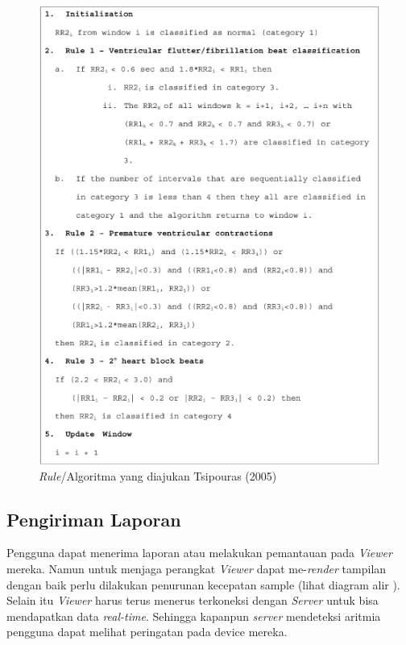 \begin{figure}[H]
	\centering
	\includegraphics[scale=0.8]{images/algo_detect.png}
	\caption{\textit{Rule}/Algoritma yang diajukan Tsipouras (2005)}
	\label{Algo:rule}
\end{figure}

\subsection{Pengiriman Laporan}
Pengguna dapat menerima laporan atau melakukan pemantauan pada \textit{Viewer} mereka. Namun untuk menjaga perangkat \textit{Viewer} dapat me-\textit{render} tampilan dengan baik perlu dilakukan penurunan kecepatan sample (lihat diagram alir ). Selain itu \textit{Viewer} harus terus menerus terkoneksi dengan \textit{Server} untuk bisa mendapatkan data \textit{real-time}. Sehingga kapanpun \textit{server} mendeteksi aritmia pengguna dapat melihat peringatan pada device mereka. 

